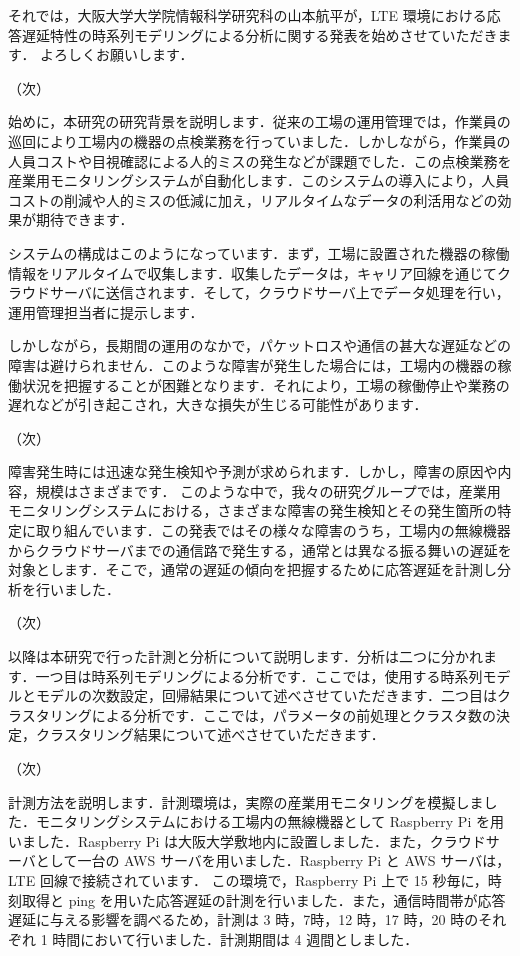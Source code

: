 \documentclass[a4j]{jarticle}
\begin{document}
それでは，大阪大学大学院情報科学研究科の山本航平が，LTE 環境における応答遅延特性の時系列モデリングによる分析に関する発表を始めさせていただきます．
よろしくお願いします．

（次）

始めに，本研究の研究背景を説明します．従来の工場の運用管理では，作業員の巡回により工場内の機器の点検業務を行っていました．しかしながら，作業員の人員コストや目視確認による人的ミスの発生などが課題でした．この点検業務を産業用モニタリングシステムが自動化します．このシステムの導入により，人員コストの削減や人的ミスの低減に加え，リアルタイムなデータの利活用などの効果が期待できます．

システムの構成はこのようになっています．まず，工場に設置された機器の稼働情報をリアルタイムで収集します．収集したデータは，キャリア回線を通じてクラウドサーバに送信されます．そして，クラウドサーバ上でデータ処理を行い，運用管理担当者に提示します．

しかしながら，長期間の運用のなかで，パケットロスや通信の甚大な遅延などの障害は避けられません．このような障害が発生した場合には，工場内の機器の稼働状況を把握することが困難となります．それにより，工場の稼働停止や業務の遅れなどが引き起こされ，大きな損失が生じる可能性があります．

（次）

障害発生時には迅速な発生検知や予測が求められます．しかし，障害の原因や内容，規模はさまざまです．
このような中で，我々の研究グループでは，産業用モニタリングシステムにおける，さまざまな障害の発生検知とその発生箇所の特定に取り組んでいます．この発表ではその様々な障害のうち，工場内の無線機器からクラウドサーバまでの通信路で発生する，通常とは異なる振る舞いの遅延を対象とします．そこで，通常の遅延の傾向を把握するために応答遅延を計測し分析を行いました．

（次）

以降は本研究で行った計測と分析について説明します．分析は二つに分かれます．一つ目は時系列モデリングによる分析です．ここでは，使用する時系列モデルとモデルの次数設定，回帰結果について述べさせていただきます．二つ目はクラスタリングによる分析です．ここでは，パラメータの前処理とクラスタ数の決定，クラスタリング結果について述べさせていただきます．

（次）

計測方法を説明します．計測環境は，実際の産業用モニタリングを模擬しました．モニタリングシステムにおける工場内の無線機器として Raspberry Pi を用いました．Raspberry Pi は大阪大学敷地内に設置しました．また，クラウドサーバとして一台の AWS サーバを用いました．Raspberry Pi と AWS サーバは，LTE 回線で接続されています．
この環境で，Raspberry Pi 上で 15 秒毎に，時刻取得と ping を用いた応答遅延の計測を行いました．また，通信時間帯が応答遅延に与える影響を調べるため，計測は 3 時，7時，12 時，17 時，20 時のそれぞれ 1 時間において行いました．計測期間は 4 週間としました．
\end{document}
